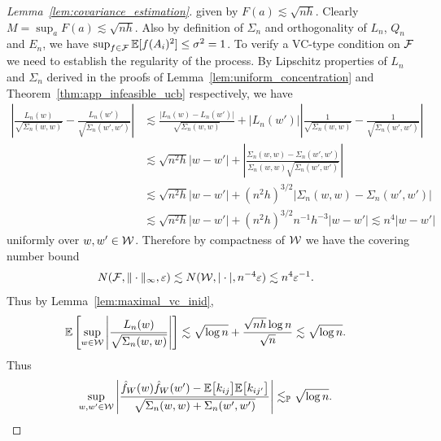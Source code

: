 \begin{proof}[Lemma~\ref{lem:covariance_estimation}]
  given by $F(a) \lesssim \sqrt{nh}$.
  Clearly $M = \sup_a F(a) \lesssim \sqrt{nh}$.
  Also by definition of $\Sigma_n$
  and orthogonality of $L_n$, $Q_n$ and $E_n$,
  we have
  $\sup_{f \in \mathcal{F}} \mathbb{E}[f(A_i)^2] \leq \sigma^2 = 1$.
  To verify a VC-type condition on $\mathcal{F}$
  we need to establish the regularity of the process.
  By Lipschitz properties
  of $L_n$ and $\Sigma_n$
  derived in the proofs of Lemma~\ref{lem:uniform_concentration}
  and Theorem~\ref{thm:app_infeasible_ucb}
  respectively,
  we have
  \begin{align*}
    \left|
    \frac{L_n(w)}
    {\sqrt{\Sigma_n(w,w)}}
    - \frac{L_n(w')}
    {\sqrt{\Sigma_n(w',w')}}
    \right|
    &\lesssim
    \frac{\big|L_n(w) - L_n(w')\big|}
    {\sqrt{\Sigma_n(w,w)}}
    +
    \left| L_n(w') \right|
    \left|
    \frac{1}
    {\sqrt{\Sigma_n(w,w)}}
    - \frac{1}
    {\sqrt{\Sigma_n(w',w')}}
    \right| \\
    &\lesssim
    \sqrt{n^2h}
    |w-w'|
    +\left|
    \frac{\Sigma_n(w,w) - \Sigma_n(w',w')}
    {\Sigma_n(w,w)\sqrt{\Sigma_n(w',w')}}
    \right| \\
    &\lesssim
    \sqrt{n^2h}
    |w-w'|
    + (n^2h)^{3/2}
    \left|
    \Sigma_n(w,w) - \Sigma_n(w',w')
    \right| \\
    &\lesssim
    \sqrt{n^2h}
    |w-w'|
    + (n^2h)^{3/2}
    n^{-1} h^{-3}
    |w-w'|
    \lesssim
    n^4 |w-w'|
  \end{align*}
  uniformly over $w,w' \in \mathcal{W}$.
  Therefore by compactness of $\mathcal{W}$
  we have the covering number bound
  \begin{align*}
    N(\mathcal{F}, \|\cdot\|_\infty, \varepsilon)
    &\lesssim
    N(\mathcal{W}, |\cdot|, n^{-4} \varepsilon)
    \lesssim n^4 \varepsilon^{-1}.
  \end{align*}
  Thus by Lemma~\ref{lem:maximal_vc_inid},
  \begin{align*}
    \mathbb{E} \left[
      \sup_{w \in \mathcal{W}}
      \left|
      \frac{L_n(w)}
      {\sqrt{\Sigma_n(w,w)}}
      \right|
    \right]
    &\lesssim
    \sqrt{\log n}
    + \frac{\sqrt{nh} \log n}{\sqrt{n}}
    \lesssim
    \sqrt{\log n}.
  \end{align*}
  Thus
  \begin{align*}
    \sup_{w,w' \in \mathcal{W}}
    \left|
    \frac{
      \hat f_W(w) \hat f_W(w')
      - \mathbb{E}\big[k_{ij}\big] \mathbb{E}\big[k_{ij'}\big]}
    {\sqrt{\Sigma_n(w,w) + \Sigma_n(w',w')}}
    \right|
    &\lesssim_{\mathbb{P}}
    \sqrt{\log n}.
  \end{align*}



\end{proof}
